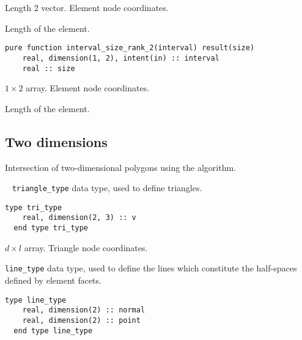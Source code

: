 \documentclass{article}
\begin{document}
\begin{description}[font=\ttfamily\bfseries,leftmargin=2.2\parindent,labelindent=1.7\parindent,noitemsep]
  \item[interval] Length $2$ vector. Element node coordinates.
  \item[size] Length of the element.
\end{description}
  
\begin{lstlisting}[language=FORTRAN]    
  pure function interval_size_rank_2(interval) result(size)
    real, dimension(1, 2), intent(in) :: interval
    real :: size
\end{lstlisting} 

\begin{description}[font=\ttfamily\bfseries,leftmargin=2.2\parindent,labelindent=1.7\parindent,noitemsep]
  \item[interval] $1 \times 2$ array. Element node coordinates.
  \item[size] Length of the element.
\end{description}

\subsection{Two dimensions}\label{sect:2D_intersection}

Intersection of two-dimensional polygons using the \citet{sutherland1974}
algorithm.

~\newline
\verb+triangle_type+ data type, used to define triangles.

\begin{lstlisting}[language=FORTRAN]    
  type tri_type
    real, dimension(2, 3) :: v
  end type tri_type
\end{lstlisting} 

\begin{description}[font=\ttfamily\bfseries,leftmargin=2.2\parindent,labelindent=1.7\parindent,noitemsep]
  \item[v] $d \times l$ array. Triangle node coordinates.
\end{description}

\noindent \verb+line_type+ data type, used to define the lines which constitute
the half-spaces defined by element facets.

\begin{lstlisting}[language=FORTRAN]   
  type line_type
    real, dimension(2) :: normal
    real, dimension(2) :: point
  end type line_type
\end{lstlisting} 
\end{document}
